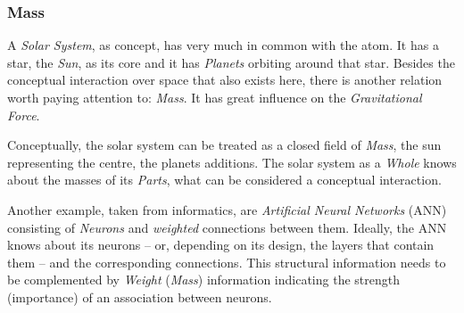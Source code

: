 %
%
%
%
%
%
%

\subsubsection{Mass}
\label{mass_heading}

A \emph{Solar System}, as concept, has very much in common with the atom. It
has a star, the \emph{Sun}, as its core and it has \emph{Planets} orbiting
around that star. Besides the conceptual interaction over space that also
exists here, there is another relation worth paying attention to: \emph{Mass}.
It has great influence on the \emph{Gravitational Force}.

Conceptually, the solar system can be treated as a closed field of \emph{Mass},
the sun representing the centre, the planets additions. The solar system as a
\emph{Whole} knows about the masses of its \emph{Parts}, what can be considered
a conceptual interaction.

Another example, taken from informatics, are \emph{Artificial Neural Networks}
(ANN) consisting of \emph{Neurons} and \emph{weighted} connections between them.
Ideally, the ANN knows
about its neurons -- or, depending on its design, the layers that contain them
-- and the corresponding connections. This structural information needs to be
complemented by \emph{Weight} (\emph{Mass}) information indicating the strength
(importance) of an association between neurons.
